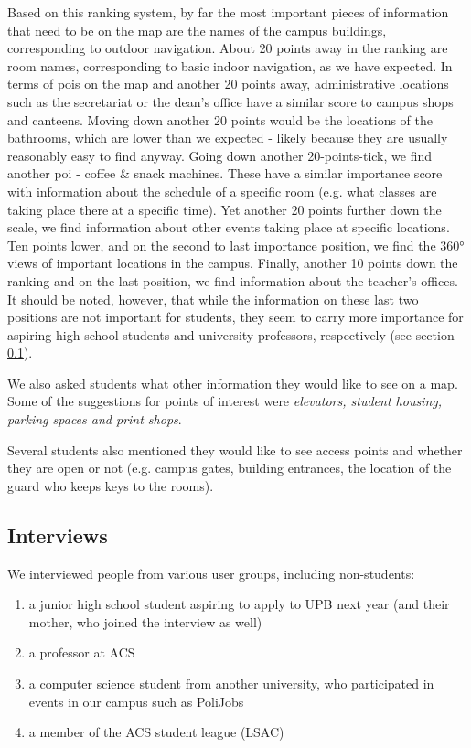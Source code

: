         Based on this ranking system, by far the most important pieces of information that need to be on the map are the names of the campus buildings, corresponding to outdoor navigation. About 20 points away in the ranking are room names, corresponding to basic indoor navigation, as we have expected. In terms of \acrshort{poi}s on the map and another 20 points away, administrative locations such as the secretariat or the dean's office have a similar score to campus shops and canteens. Moving down another 20 points would be the locations of the bathrooms, which are lower than we expected - likely because they are usually reasonably easy to find anyway. Going down another 20-points-tick, we find another \acrshort{poi} - coffee \& snack machines. These have a similar importance score with information about the schedule of a specific room (e.g. what classes are taking place there at a specific time). Yet another 20 points further down the scale, we find information about other events taking place at specific locations. Ten points lower, and on the second to last importance position, we find the 360° views of important locations in the campus. Finally, another 10 points down the ranking and on the last position, we find information about the teacher's offices. It should be noted, however, that while the information on these last two positions are not important for students, they seem to carry more importance for aspiring high school students and university professors, respectively (see section \ref{4:interviews}).
        
        We also asked students what other information they would like to see on a map. Some of the suggestions for points of interest were \textit{elevators, student housing, parking spaces and print shops}.
        
        Several students also mentioned they would like to see access points and whether they are open or not (e.g. campus gates, building entrances, the location of the guard who keeps keys to the rooms).
        
    \subsection{Interviews} \label{4:interviews}
        We interviewed people from various user groups, including non-students:
        \begin{enumerate}
            \itemsep0em
            \vspace{-0.2cm}\item[(1)] a junior high school student aspiring to apply to UPB next year (and their mother, who joined the interview as well)
            \vspace{-0.2cm}\item[(2)] a professor at ACS
            \vspace{-0.2cm}\item[(3)] a computer science student from another university, who participated in events in our campus such as PoliJobs
            \vspace{-0.2cm}\item[(4)] a member of the ACS student league (LSAC)
        \end{enumerate}
        
